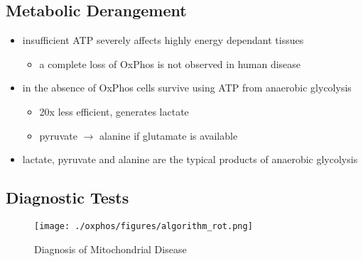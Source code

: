 \documentclass{scrartcl}
\begin{document}
\subsection{Metabolic Derangement}
\label{sec:org0f02fc1}
\begin{itemize}
\item insufficient ATP severely affects highly energy dependant tissues
\begin{itemize}
\item a complete loss of OxPhos is not observed in human disease
\end{itemize}
\item in the absence of OxPhos cells survive using ATP from anaerobic glycolysis
\begin{itemize}
\item 20x less efficient, generates lactate
\item pyruvate \(\to\) alanine if glutamate is available
\end{itemize}
\item lactate, pyruvate and alanine are the typical products of anaerobic glycolysis
\end{itemize}

\subsection{Diagnostic Tests}
\label{sec:orgf5b1545}

\begin{figure}[htbp]
\centering
\texttt{[image: ./oxphos/figures/algorithm\_rot.png]}
\caption{\label{fig:orgb90eba4}
Diagnosis of Mitochondrial Disease}
\end{figure}
\end{document}
